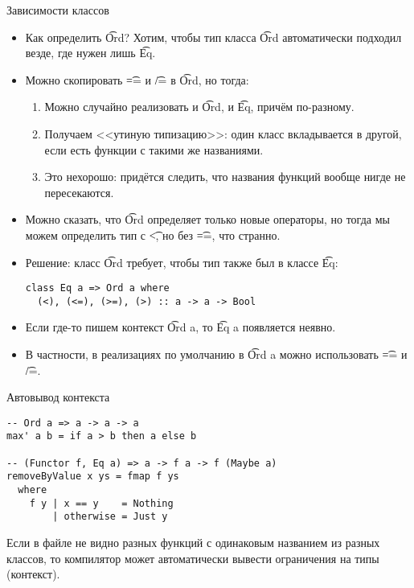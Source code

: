 \begin{frame}[fragile]{Зависимости классов}
	\begin{itemize}
		\item Как определить \t{Ord}? Хотим, чтобы тип класса \t{Ord} автоматически подходил везде, где нужен лишь \t{Eq}.
		\item Можно скопировать \t{==} и \t{/=} в \t{Ord}, но тогда:
			\begin{enumerate}
				\item Можно случайно реализовать и \t{Ord}, и \t{Eq}, причём по-разному.
				\item Получаем <<утиную типизацию>>: один класс вкладывается в другой, если есть функции с такими же названиями.
				\item Это нехорошо: придётся следить, что названия функций вообще нигде не пересекаются.
			\end{enumerate}
		\item Можно сказать, что \t{Ord} определяет только новые операторы, но тогда мы можем определить тип с \t{<}, но без \t{==}, что странно.
		\item Решение: класс \t{Ord} требует, чтобы тип также был в классе \t{Eq}:
\begin{verbatim}
class Eq a => Ord a where
  (<), (<=), (>=), (>) :: a -> a -> Bool
\end{verbatim}
		\item Если где-то пишем контекст \t{Ord a}, то \t{Eq a} появляется неявно.
		\item В частности, в реализациях по умолчанию в \t{Ord a} можно использовать \t{==} и \t{/=}.
	\end{itemize}
\end{frame}

\begin{frame}[fragile]{Автовывод контекста}
\begin{verbatim}
-- Ord a => a -> a -> a
max' a b = if a > b then a else b

-- (Functor f, Eq a) => a -> f a -> f (Maybe a)
removeByValue x ys = fmap f ys
  where
    f y | x == y    = Nothing
        | otherwise = Just y
\end{verbatim}
	Если в файле не видно разных функций с одинаковым названием из разных классов, то компилятор может автоматически вывести ограничения на типы (контекст).
\end{frame}

